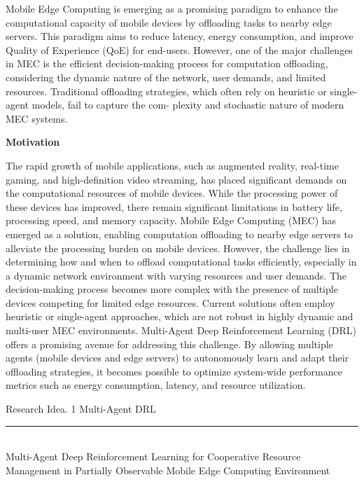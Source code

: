 \documentclass[12pt]{article}
\begin{document}
Mobile Edge Computing is emerging as a promising paradigm to enhance the computational capacity of mobile devices by offloading tasks to nearby edge servers. This paradigm aims to reduce latency, energy consumption, and improve Quality of Experience (QoE) for end-users. However, one of the major challenges in MEC is the efficient decision-making process for computation offloading, considering the dynamic nature of the network, user demands, and limited resources. Traditional offloading strategies, which often rely on heuristic or single-agent models, fail to capture the com- plexity and stochastic nature of modern MEC systems. 


	
\vspace{8mm}

\noindent\textbf{\large Motivation}

\vspace{1.5mm}

The rapid growth of mobile applications, such as augmented reality, real-time gaming, and high-definition video streaming, has placed significant demands on the computational resources of mobile devices. While the processing power of these devices has improved, there remain significant limitations in battery life, processing speed, and memory capacity. Mobile Edge Computing (MEC) has emerged as a solution, enabling computation offloading to nearby edge servers to alleviate the processing burden on mobile devices. However, the challenge lies in determining how and when to offload computational tasks efficiently, especially in a dynamic network environment with varying resources and user demands. The decision-making process becomes more complex with the presence of multiple devices competing for limited edge resources. Current solutions often employ heuristic or single-agent approaches, which are not robust in highly dynamic and multi-user MEC environments. Multi-Agent Deep Reinforcement Learning (DRL) offers a promising avenue for addressing this challenge. By allowing multiple agents (mobile devices and edge servers) to autonomously learn and adapt their offloading strategies, it becomes possible to optimize system-wide performance metrics such as energy consumption, latency, and resource utilization. 

\newpage






\begin{center} 
	
	
	\vspace{-17mm}

	\large Research Idea. 1  \hfill Multi-Agent DRL \vspace{1mm} \hrule
	
	\vspace{-1mm}
	
	\textcolor{white}{i} \\ \LARGE Multi-Agent Deep Reinforcement Learning for Cooperative Resource Management in Partially Observable Mobile Edge Computing Environment \vspace{6mm}\\

\end{center}
\end{document}
